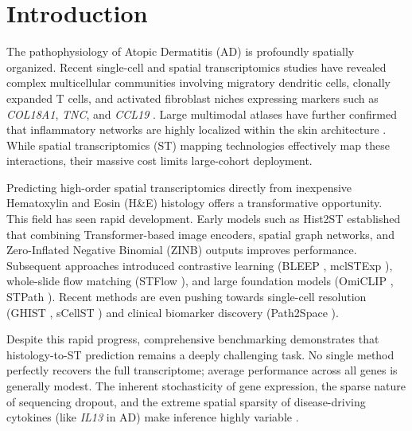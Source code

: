 \documentclass{bioinfo}
\begin{document}
\linenumbers


\section{Introduction}

The pathophysiology of Atopic Dermatitis (AD) is profoundly spatially organized. Recent single-cell and spatial transcriptomics studies have revealed complex multicellular communities involving migratory dendritic cells, clonally expanded T cells, and activated fibroblast niches expressing markers such as \textit{COL18A1}, \textit{TNC}, and \textit{CCL19} \cite{reynolds2021developmental,schabitz2022,mitamura2023}. Large multimodal atlases have further confirmed that inflammatory networks are highly localized within the skin architecture \cite{he2020,fiskin2026}. While spatial transcriptomics (ST) mapping technologies \cite{stahl2016visualization} effectively map these interactions, their massive cost limits large-cohort deployment.

Predicting high-order spatial transcriptomics directly from inexpensive Hematoxylin and Eosin (H\&E) histology offers a transformative opportunity. This field has seen rapid development. Early models such as Hist2ST \cite{hist2st2022} established that combining Transformer-based image encoders, spatial graph networks, and Zero-Inflated Negative Binomial (ZINB) outputs improves performance. Subsequent approaches introduced contrastive learning (BLEEP \cite{bleep2023}, mclSTExp \cite{mclstexp2024}), whole-slide flow matching (STFlow \cite{stflow2025}), and large foundation models (OmiCLIP \cite{omiclip2025}, STPath \cite{stpath2025}). Recent methods are even pushing towards single-cell resolution (GHIST \cite{ghist2025}, sCellST \cite{scellst2026}) and clinical biomarker discovery (Path2Space \cite{path2space2026}).

Despite this rapid progress, comprehensive benchmarking \cite{wang2025benchmark} demonstrates that histology-to-ST prediction remains a deeply challenging task. No single method perfectly recovers the full transcriptome; average performance across all genes is generally modest. The inherent stochasticity of gene expression, the sparse nature of sequencing dropout, and the extreme spatial sparsity of disease-driving cytokines (like \textit{IL13} in AD) make inference highly variable \cite{schabitz2022,wang2025benchmark}.
\end{document}
